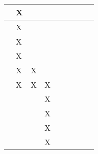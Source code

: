 \begin{longtable}{|l|llllllll|}
    \cite[]{Ningombam.2022}       & \multicolumn{1}{l|}{X}   & \multicolumn{1}{l|}{}     & \multicolumn{1}{l|}{}   & \multicolumn{1}{l|}{}   & \multicolumn{1}{l|}{}   & \multicolumn{1}{l|}{}   & \multicolumn{1}{l|}{}     &    \\ \hline
    \cite[]{Arulkumaran.2017}     & \multicolumn{1}{l|}{X}   & \multicolumn{1}{l|}{}     & \multicolumn{1}{l|}{}   & \multicolumn{1}{l|}{}   & \multicolumn{1}{l|}{}   & \multicolumn{1}{l|}{}   & \multicolumn{1}{l|}{}     &    \\ \hline
    \cite[]{Huang.2017}           & \multicolumn{1}{l|}{X}   & \multicolumn{1}{l|}{}     & \multicolumn{1}{l|}{}   & \multicolumn{1}{l|}{}   & \multicolumn{1}{l|}{}   & \multicolumn{1}{l|}{}   & \multicolumn{1}{l|}{}     &    \\ \hline
    \cite[]{Mnih.2013}            & \multicolumn{1}{l|}{X}   & \multicolumn{1}{l|}{}     & \multicolumn{1}{l|}{}   & \multicolumn{1}{l|}{}   & \multicolumn{1}{l|}{}   & \multicolumn{1}{l|}{}   & \multicolumn{1}{l|}{}     &    \\ \hline
    \cite[]{Wong.2022}            & \multicolumn{1}{l|}{X}   & \multicolumn{1}{l|}{X}    & \multicolumn{1}{l|}{}   & \multicolumn{1}{l|}{}   & \multicolumn{1}{l|}{}   & \multicolumn{1}{l|}{}   & \multicolumn{1}{l|}{}     &    \\ \hline
    \cite[]{Schuderer.2021}       & \multicolumn{1}{l|}{X}   & \multicolumn{1}{l|}{X}    & \multicolumn{1}{l|}{X}   & \multicolumn{1}{l|}{}   & \multicolumn{1}{l|}{}   & \multicolumn{1}{l|}{}   & \multicolumn{1}{l|}{}     &    \\ \hline
    \cite[]{Korber.2021}          & \multicolumn{1}{l|}{}   & \multicolumn{1}{l|}{}    & \multicolumn{1}{l|}{X}   & \multicolumn{1}{l|}{}   & \multicolumn{1}{l|}{}   & \multicolumn{1}{l|}{}   & \multicolumn{1}{l|}{}     &    \\ \hline
    \cite[]{Bharadhwaj.2019}      & \multicolumn{1}{l|}{}   & \multicolumn{1}{l|}{}    & \multicolumn{1}{l|}{X}   & \multicolumn{1}{l|}{}   & \multicolumn{1}{l|}{}   & \multicolumn{1}{l|}{}   & \multicolumn{1}{l|}{}     &    \\ \hline
    \cite[]{Foronda.2021}         & \multicolumn{1}{l|}{}   & \multicolumn{1}{l|}{}    & \multicolumn{1}{l|}{X}   & \multicolumn{1}{l|}{}   & \multicolumn{1}{l|}{}   & \multicolumn{1}{l|}{}   & \multicolumn{1}{l|}{}     &    \\ \hline
    \cite[]{Maria.1997}           & \multicolumn{1}{l|}{}   & \multicolumn{1}{l|}{}    & \multicolumn{1}{l|}{X}   & \multicolumn{1}{l|}{}   & \multicolumn{1}{l|}{}   & \multicolumn{1}{l|}{}   & \multicolumn{1}{l|}{}     &    \\ \hline

\end{longtable}
